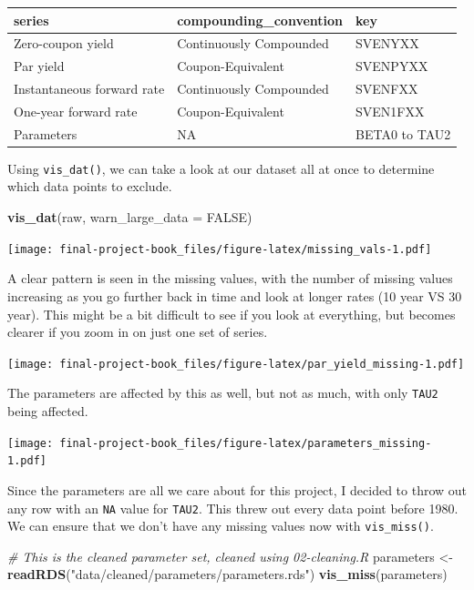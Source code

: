 \documentclass[]{book}
\newenvironment{Shaded}{\begin{snugshade}}{\end{snugshade}}
\newcommand{\CommentTok}[1]{\textcolor[rgb]{0.56,0.35,0.01}{\textit{#1}}}
\newcommand{\DataTypeTok}[1]{\textcolor[rgb]{0.13,0.29,0.53}{#1}}
\newcommand{\KeywordTok}[1]{\textcolor[rgb]{0.13,0.29,0.53}{\textbf{#1}}}
\newcommand{\NormalTok}[1]{#1}
\newcommand{\OtherTok}[1]{\textcolor[rgb]{0.56,0.35,0.01}{#1}}
\newcommand{\StringTok}[1]{\textcolor[rgb]{0.31,0.60,0.02}{#1}}
\theoremstyle{definition}
\theoremstyle{definition}
\theoremstyle{definition}
\theoremstyle{remark}
\begin{document}
\begin{tabular}{l|l|l}
\hline
series & compounding\_convention & key\\
\hline
Zero-coupon yield & Continuously Compounded & SVENYXX\\
\hline
Par yield & Coupon-Equivalent & SVENPYXX\\
\hline
Instantaneous forward rate & Continuously Compounded & SVENFXX\\
\hline
One-year forward rate & Coupon-Equivalent & SVEN1FXX\\
\hline
Parameters & NA & BETA0 to TAU2\\
\hline
\end{tabular}

Using \texttt{vis\_dat()}, we can take a look at our dataset all at once
to determine which data points to exclude.

\begin{Shaded}
\begin{Highlighting}[]
\KeywordTok{vis_dat}\NormalTok{(raw, }\DataTypeTok{warn_large_data =} \OtherTok{FALSE}\NormalTok{)}
\end{Highlighting}
\end{Shaded}

\texttt{[image: final-project-book\_files/figure-latex/missing\_vals-1.pdf]}

A clear pattern is seen in the missing values, with the number of
missing values increasing as you go further back in time and look at
longer rates (10 year VS 30 year). This might be a bit difficult to see
if you look at everything, but becomes clearer if you zoom in on just
one set of series.

\texttt{[image: final-project-book\_files/figure-latex/par\_yield\_missing-1.pdf]}

The parameters are affected by this as well, but not as much, with only
\texttt{TAU2} being affected.

\texttt{[image: final-project-book\_files/figure-latex/parameters\_missing-1.pdf]}

Since the parameters are all we care about for this project, I decided
to throw out any row with an \texttt{NA} value for \texttt{TAU2}. This
threw out every data point before 1980. We can ensure that we don't have
any missing values now with \texttt{vis\_miss()}.

\begin{Shaded}
\begin{Highlighting}[]
\CommentTok{# This is the cleaned parameter set, cleaned using 02-cleaning.R}
\NormalTok{parameters <-}\StringTok{ }\KeywordTok{readRDS}\NormalTok{(}\StringTok{"data/cleaned/parameters/parameters.rds"}\NormalTok{)}
\KeywordTok{vis_miss}\NormalTok{(parameters)}
\end{Highlighting}
\end{Shaded}
\end{document}
